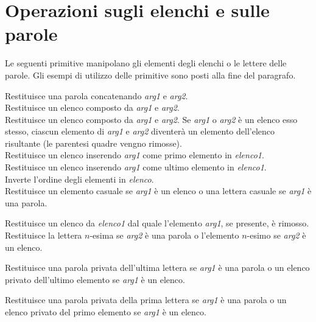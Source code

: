 \section{Operazioni sugli elenchi e sulle parole}

Le seguenti primitive manipolano gli elementi degli elenchi o le lettere delle parole. Gli esempi di utilizzo delle primitive sono posti alla fine del paragrafo.

Restituisce una parola concatenando \textit{arg1} e \textit{arg2}.\\

Restituisce un elenco composto da \textit{arg1} e \textit{arg2}.\\

Restituisce un elenco composto da \textit{arg1} e \textit{arg2}. Se \textit{arg1} o \textit{arg2} è un elenco esso stesso, ciascun elemento di \textit{arg1} e \textit{arg2} diventerà un elemento dell'elenco risultante (le parentesi quadre vengno rimosse).\\

 Restituisce un elenco inserendo \textit{arg1} come primo elemento in \textit{elenco1}.\\

 Restituisce un elenco inserendo \textit{arg1} come ultimo elemento in \textit{elenco1}.\\

 Inverte l'ordine degli elementi in \textit{elenco}.\\

Restituisce un elemento casuale se \textit{arg1} è un elenco o una lettera casuale se \textit{arg1} è una parola.

Restituisce un elenco da \textit{elenco1} dal quale l'elemento \textit{arg1}, se presente, è rimosso.\\

Restituisce la lettera $n$-esima se \textit{arg2} è una parola o l'elemento $n$-esimo se \textit{arg2} è un elenco.

Restituisce una parola privata dell'ultima lettera se \textit{arg1} è una parola o un elenco privato dell'ultimo elemento se \textit{arg1} è un elenco.

Restituisce una parola privata della prima lettera se \textit{arg1} è una parola o un elenco privato del primo elemento se \textit{arg1} è un elenco.

